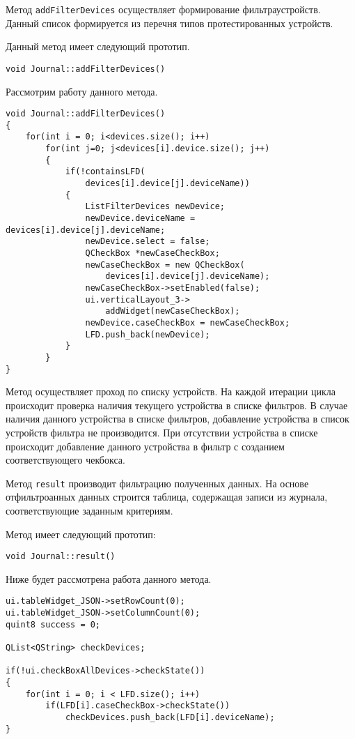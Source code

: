 Метод \texttt{addFilterDevices} осуществляет формирование фильтра\break устройств. Данный список формируется из перечня типов
протестированных устройств.

Данный метод
имеет следующий прототип.
\medskip
\begin{verbatim}
void Journal::addFilterDevices()
\end{verbatim}
\medskip

Рассмотрим работу данного метода.
\medskip
\begin{verbatim}
void Journal::addFilterDevices()
{
	for(int i = 0; i<devices.size(); i++)
		for(int j=0; j<devices[i].device.size(); j++)
		{
			if(!containsLFD(
				devices[i].device[j].deviceName))
			{
				ListFilterDevices newDevice;
				newDevice.deviceName = devices[i].device[j].deviceName;
				newDevice.select = false;
				QCheckBox *newCaseCheckBox;
				newCaseCheckBox = new QCheckBox(
					devices[i].device[j].deviceName);
				newCaseCheckBox->setEnabled(false);
				ui.verticalLayout_3->
					addWidget(newCaseCheckBox);
				newDevice.caseCheckBox = newCaseCheckBox;
				LFD.push_back(newDevice);
			}
		}
}
\end{verbatim}
\medskip

Метод осуществляет проход по списку устройств. На каждой итерации цикла происходит проверка наличия текущего устройства в
списке фильтров. В случае наличия данного устройства в списке фильтров, добавление устройства в список устройств
фильтра не производится. При отсутствии устройства в списке происходит добавление данного устройства в фильтр с
созданием соответствующего чекбокса.

Метод \texttt{result} производит фильтрацию полученных данных. На основе отфильтроанных данных строится таблица,
содержащая записи из журнала, соответствующие заданным критериям.

Метод имеет следующий прототип:
\medskip
\begin{verbatim}
void Journal::result()
\end{verbatim}
\medskip

Ниже будет рассмотрена работа данного метода.
\medskip
\begin{verbatim}
ui.tableWidget_JSON->setRowCount(0);
ui.tableWidget_JSON->setColumnCount(0);
quint8 success = 0;

QList<QString> checkDevices;

if(!ui.checkBoxAllDevices->checkState())
{
	for(int i = 0; i < LFD.size(); i++)
		if(LFD[i].caseCheckBox->checkState())
			checkDevices.push_back(LFD[i].deviceName);
}
\end{verbatim}
\medskip


